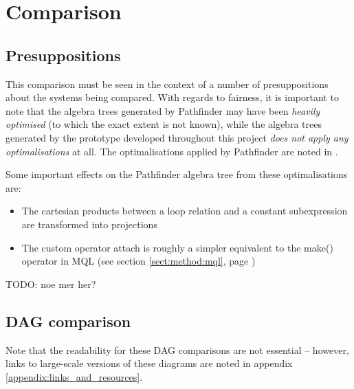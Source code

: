 \section{Comparison}
\label{sect:results:comparison}
\subsection{Presuppositions}
This comparison must be seen in the context of a number of presuppositions
about the systems being compared. With regards to fairness, it is important to
note that the algebra trees generated by Pathfinder may have been \emph{heavily
optimised} (to which the exact extent is not known), while the algebra trees
generated by the prototype developed throughout this project \emph{does not apply any optimalisations} at all. The
optimalisations applied by Pathfinder are noted
in \cite{pathfinder_purelyRelational}.

Some important effects on the Pathfinder algebra tree from these
optimalisations are:
\begin{itemize}
  \item The cartesian products between a loop relation and a constant
  subexpression are transformed into projections
  \item The custom operator \textsf{attach} is roughly a simpler equivalent to
  the \textsf{make()} operator in MQL (see section \ref{sect:method:mql}, page
  \pageref{sect:method:mql})
\end{itemize}
TODO: noe mer her?

\newpage
\subsection{DAG comparison}
Note that the readability for these DAG comparisons are not essential --
however, links to large-scale versions of these diagrams are noted in appendix
\ref{appendix:links_and_resources}.

